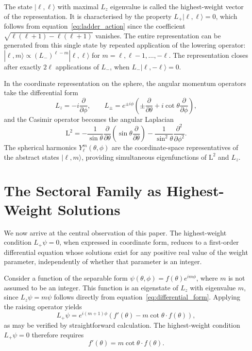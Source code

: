 \documentclass[
  aip,
  amsmath,amssymb,
  preprint
]{revtex4-1}
\begin{document}
The state $|\ell, \ell\rangle$ with maximal $L_z$ eigenvalue is called the highest-weight vector of the representation. It is characterised by the property $L_+ |\ell, \ell\rangle = 0$, which follows from equation~\eqref{eq:ladder_action} since the coefficient $\sqrt{\ell(\ell+1) - \ell(\ell+1)}$ vanishes. The entire representation can be generated from this single state by repeated application of the lowering operator: $|\ell, m\rangle \propto (L_-)^{\ell - m} |\ell, \ell\rangle$ for $m = \ell, \ell-1, \ldots, -\ell$. The representation closes after exactly $2\ell$ applications of $L_-$, when $L_- |\ell, -\ell\rangle = 0$.

In the coordinate representation on the sphere, the angular momentum operators take the differential form~\cite{Sakurai2017}
\begin{equation}
L_z = -i\frac{\partial}{\partial\phi}, \qquad L_\pm = e^{\pm i\phi}\left(\pm\frac{\partial}{\partial\theta} + i\cot\theta\frac{\partial}{\partial\phi}\right),
\label{eq:differential_form}
\end{equation}
and the Casimir operator becomes the angular Laplacian
\begin{equation}
\mathrm{L}^2 = -\frac{1}{\sin\theta}\frac{\partial}{\partial\theta}\left(\sin\theta\frac{\partial}{\partial\theta}\right) - \frac{1}{\sin^2\theta}\frac{\partial^2}{\partial\phi^2}.
\label{eq:angular_laplacian}
\end{equation}
The spherical harmonics $Y_\ell^m(\theta, \phi)$ are the coordinate-space representatives of the abstract states $|\ell, m\rangle$, providing simultaneous eigenfunctions of $\mathrm{L}^2$ and $L_z$.


\section{The Sectoral Family as Highest-Weight Solutions}

We now arrive at the central observation of this paper. The highest-weight condition $L_+ \psi = 0$, when expressed in coordinate form, reduces to a first-order differential equation whose solutions exist for any positive real value of the weight parameter, independently of whether that parameter is an integer.

Consider a function of the separable form $\psi(\theta, \phi) = f(\theta) e^{im\phi}$, where $m$ is not assumed to be an integer. This function is an eigenstate of $L_z$ with eigenvalue $m$, since $L_z \psi = m\psi$ follows directly from equation~\eqref{eq:differential_form}. Applying the raising operator yields
\begin{equation}
L_+ \psi = e^{i(m+1)\phi}\left(f'(\theta) - m\cot\theta \cdot f(\theta)\right),
\label{eq:raising_applied}
\end{equation}
as may be verified by straightforward calculation. The highest-weight condition $L_+ \psi = 0$ therefore requires
\begin{equation}
f'(\theta) = m\cot\theta \cdot f(\theta).
\label{eq:first_order}
\end{equation}
\end{document}
